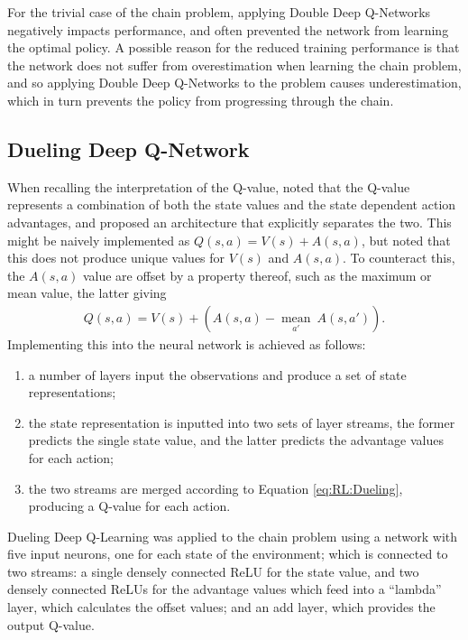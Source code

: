 For the trivial case of the chain problem, applying Double Deep Q-Networks
negatively impacts performance, and often prevented the network from learning
the optimal policy.
A possible reason for the reduced training performance is that the network does
not suffer from overestimation when learning the chain problem, and so applying
Double Deep Q-Networks to the problem causes underestimation, which in turn
prevents the policy from progressing through the chain.



\subsection{Dueling Deep Q-Network}\label{sec:RL:Dueling}

When recalling the interpretation of the Q-value, \cite{Wang:2015:Dueling} noted
that the Q-value represents a combination of both the state values and the state
dependent action advantages, and proposed an architecture that explicitly
separates the two.
This might be naively implemented as $Q(s,a) = V(s) + A(s,a)$, but
\citeauthor{Wang:2015:Dueling} noted that this does not produce unique values
for $V(s)$ and $A(s,a)$.
To counteract this, the $A(s,a)$ value are offset by a property thereof, such as
the maximum or mean value, the latter giving
\begin{align}
    Q(s,a) = V(s) + \left(A(s,a) - \underset{a'}{\operatorname{mean}}\ A(s,a')\right).
    \label{eq:RL:Dueling}
\end{align}
Implementing this into the neural network is achieved as follows:
\begin{enumerate}
    \item a number of layers input the observations and produce a set of state
        representations;
    \item the state representation is inputted into two sets of layer streams,
        the former predicts the single state value, and the latter predicts the
        advantage values for each action;
    \item the two streams are merged according to Equation \ref{eq:RL:Dueling},
        producing a Q-value for each action.
\end{enumerate}


Dueling Deep Q-Learning was applied to the chain problem using a network with
five input neurons, one for each state of the environment; which is connected
to two streams: a single densely connected ReLU for the state value, and two
densely connected ReLUs for the advantage values which feed into a ``lambda''
layer, which calculates the offset values; and an add layer, which provides the
output Q-value.


